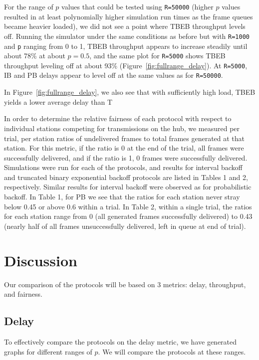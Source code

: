 \documentclass[twocolumn]{article}
\begin{document}
For the range of $p$ values that could be tested using \verb|R=50000| (higher
$p$ values resulted in at least polynomially higher simulation run times as the frame queues
became heavier loaded), we did not see a point where TBEB throughput levels off. Running
the simulator under the same conditions as before but with \verb|R=1000| and \verb|p| ranging
from 0 to 1, TBEB throughput appears to increase steadily until about 78\% at about $p = 0.5$,
and the same plot for \verb|R=5000| shows TBEB throughput leveling off at about 93\% 
(Figure~\ref{fig:fullrange_delay}). At \verb|R=5000|, IB and PB delays appear to level off at the
same values as for \verb|R=50000|.

In Figure~\ref{fig:fullrange_delay}, we also see that with sufficiently high load, TBEB yields
a lower average delay than T

In order to determine the relative fairness of each protocol with respect to individual stations
competing for transmissions on the hub, we measured per trial, per station ratios of 
undelivered frames to total frames generated at that station. For this metric, if the ratio
is 0 at the end of the trial, all frames were successfully delivered, and if the ratio is 1, 0
frames were successfully delivered. Simulations were run for
each of the protocols, and results for interval backoff and truncated binary exponential
backoff protocols are listed in Tables 1 and 2, respectively. Similar results for interval
backoff were observed as for probabilistic backoff. In Table 1, for PB we see that the
ratios for each station never stray below 0.45 or above 0.6 within a trial. In Table 2,
within a single trial, the ratios for each station range from 0 (all generated frames 
successfully delivered) to 0.43 (nearly half of all frames unsuccessfully delivered, left
in queue at end of trial).



\section*{Discussion}
Our comparison of the protocols will be based on 3 metrics: delay, throughput, and fairness.

\subsection*{Delay} To effectively compare the protocols on the delay metric, we have generated
graphs for different ranges of $p$. We will compare the protocols at these ranges.
\end{document}
